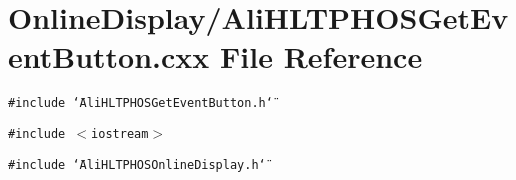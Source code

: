 \section{Online\-Display/Ali\-HLTPHOSGet\-Event\-Button.cxx File Reference}
\label{AliHLTPHOSGetEventButton_8cxx}


{\tt \#include \char`\"{}Ali\-HLTPHOSGet\-Event\-Button.h\char`\"{}}\par
{\tt \#include $<$iostream$>$}\par
{\tt \#include \char`\"{}Ali\-HLTPHOSOnline\-Display.h\char`\"{}}\par
